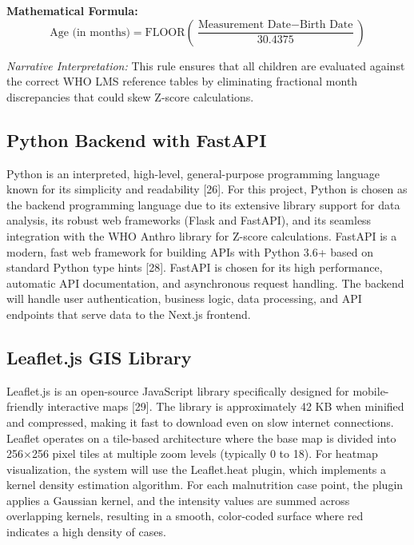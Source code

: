 \documentclass[12pt, a4paper]{report}
\begin{document}
\noindent \textbf{Mathematical Formula:}
\begin{equation}
    \text{Age (in months)} = \text{FLOOR}\left(\frac{\text{Measurement Date} - \text{Birth Date}}{30.4375}\right)
\end{equation}

\textit{Narrative Interpretation:} This rule ensures that all children are evaluated against the correct WHO LMS reference tables by eliminating fractional month discrepancies that could skew Z-score calculations.

\subsection{Python Backend with FastAPI}
\label{subsec:python}
Python is an interpreted, high-level, general-purpose programming language known for its simplicity and readability [26]. For this project, Python is chosen as the backend programming language due to its extensive library support for data analysis, its robust web frameworks (Flask and FastAPI), and its seamless integration with the WHO Anthro library for Z-score calculations.
FastAPI is a modern, fast web framework for building APIs with Python 3.6+ based on standard Python type hints [28]. FastAPI is chosen for its high performance, automatic API documentation, and asynchronous request handling. The backend will handle user authentication, business logic, data processing, and API endpoints that serve data to the Next.js frontend.

\subsection{Leaflet.js GIS Library}
\label{subsec:leaflet}
Leaflet.js is an open-source JavaScript library specifically designed for mobile-friendly interactive maps [29]. The library is approximately 42 KB when minified and compressed, making it fast to download even on slow internet connections. Leaflet operates on a tile-based architecture where the base map is divided into 256\(\times\)256 pixel tiles at multiple zoom levels (typically 0 to 18). For heatmap visualization, the system will use the Leaflet.heat plugin, which implements a kernel density estimation algorithm. For each malnutrition case point, the plugin applies a Gaussian kernel, and the intensity values are summed across overlapping kernels, resulting in a smooth, color-coded surface where red indicates a high density of cases.
\end{document}
